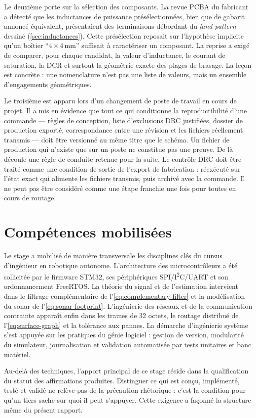 Le deuxième porte sur la sélection des composants. La revue PCBA du fabricant a détecté que les inductances de puissance présélectionnées, bien que de gabarit annoncé équivalent, présentaient des terminaisons débordant du \emph{land pattern} dessiné (\cref{sec:inductances}). Cette présélection reposait sur l'hypothèse implicite qu'un boîtier \enquote{$4\times4$\,mm} suffisait à caractériser un composant. La reprise a exigé de comparer, pour chaque candidat, la valeur d'inductance, le courant de saturation, la DCR et surtout la géométrie exacte des plages de brasage. La leçon est concrète : une nomenclature n'est pas une liste de valeurs, mais un ensemble d'engagements géométriques.

Le troisième est apparu lors d'un changement de poste de travail en cours de projet. Il a mis en évidence que tout ce qui conditionne la reproductibilité d'une commande --- règles de conception, liste d'exclusions DRC justifiées, dossier de production exporté, correspondance entre une révision et les fichiers réellement transmis --- doit être versionné au même titre que le schéma. Un fichier de production qui n'existe que sur un poste ne constitue pas une preuve. De là découle une règle de conduite retenue pour la suite. Le contrôle DRC doit être traité comme une condition de sortie de l'export de fabrication : réexécuté sur l'état exact qui alimente les fichiers transmis, puis archivé avec la commande. Il ne peut pas être considéré comme une étape franchie une fois pour toutes en cours de routage.

\section{Compétences mobilisées}

Le stage a mobilisé de manière transversale les disciplines clés du cursus d'ingénieur en robotique autonome. L'architecture des microcontrôleurs a été sollicitée par le firmware STM32, ses périphériques SPI/I\textsuperscript{2}C/UART et son ordonnancement FreeRTOS. La théorie du signal et de l'estimation intervient dans le filtrage complémentaire de l'\cref{eq:complementary-filter} et la modélisation du sonar de l'\cref{eq:sonar-footprint}. L'ingénierie des réseaux et de la communication contrainte apparaît enfin dans les trames de 32 octets, le routage distribué de l'\cref{eq:surface-graph} et la tolérance aux pannes. La démarche d'ingénierie système s'est appuyée sur les pratiques du génie logiciel : gestion de version, modularité du simulateur, journalisation et validation automatisée par tests unitaires et banc matériel.

Au-delà des techniques, l'apport principal de ce stage réside dans la qualification du statut des affirmations produites. Distinguer ce qui est conçu, implémenté, testé et validé ne relève pas de la précaution rhétorique : c'est la condition pour qu'un tiers sache sur quoi il peut s'appuyer. Cette exigence a façonné la structure même du présent rapport.
